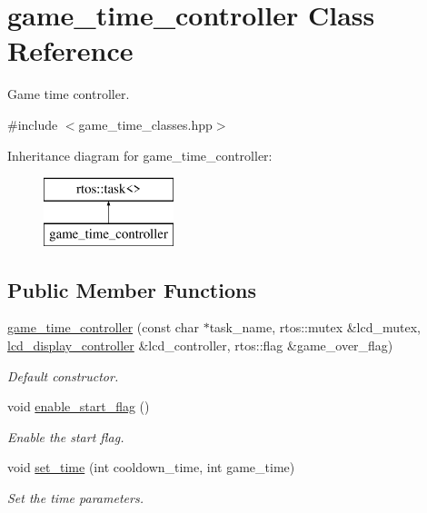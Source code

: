 \hypertarget{classgame__time__controller}{}\section{game\+\_\+time\+\_\+controller Class Reference}
\label{classgame__time__controller}


Game time controller.  




{\ttfamily \#include $<$game\+\_\+time\+\_\+classes.\+hpp$>$}

Inheritance diagram for game\+\_\+time\+\_\+controller\+:\begin{figure}[H]
\begin{center}
\leavevmode
\includegraphics[height=2.000000cm]{classgame__time__controller}
\end{center}
\end{figure}
\subsection*{Public Member Functions}
\begin{DoxyCompactItemize}
\item 
\hyperlink{classgame__time__controller_ad2a906f75a90ca5c906aeb8093ac579b}{game\+\_\+time\+\_\+controller} (const char $\ast$task\+\_\+name, rtos\+::mutex \&lcd\+\_\+mutex, \hyperlink{classlcd__display__controller}{lcd\+\_\+display\+\_\+controller} \&lcd\+\_\+controller, rtos\+::flag \&game\+\_\+over\+\_\+flag)
\begin{DoxyCompactList}\small\item\em Default constructor. \end{DoxyCompactList}\item 
void \hyperlink{classgame__time__controller_a33a1f1c002465109b1caacedbf1a820f}{enable\+\_\+start\+\_\+flag} ()
\begin{DoxyCompactList}\small\item\em Enable the start flag. \end{DoxyCompactList}\item 
void \hyperlink{classgame__time__controller_a01ace9e573244e15cd28c074792b52f6}{set\+\_\+time} (int cooldown\+\_\+time, int game\+\_\+time)
\begin{DoxyCompactList}\small\item\em Set the time parameters. \end{DoxyCompactList}\end{DoxyCompactItemize}


